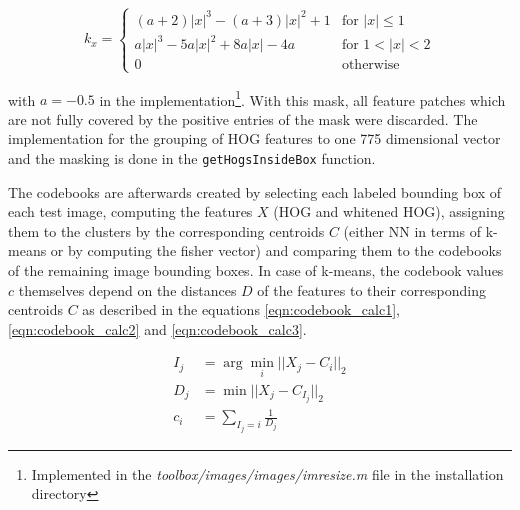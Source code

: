 \begin{equation}
k_x = \begin{cases}
(a+2)|x|^3-(a+3)|x|^2+1 & \text{for } |x| \leq 1 \\
a|x|^3-5a|x|^2+8a|x|-4a & \text{for } 1 < |x| < 2 \\
0                       & \text{otherwise}
\end{cases}
\label{eqn:bicubic_kernel}
\end{equation}

with $a=-0.5$ in the \MATLAB implementation\footnote{Implemented in the \textit{toolbox/images/images/imresize.m} file in the \MATLAB installation directory}. With this mask, all feature patches which are not fully covered by the positive entries of the mask were discarded. The implementation for the grouping of \ac{HOG} features to one 775 dimensional vector and the masking is done in the \verb|getHogsInsideBox| function.
\bigskip

The codebooks are afterwards created by selecting each labeled bounding box of each test image, computing the features $X$ (\ac{HOG} and whitened \ac{HOG}), assigning them to the clusters by the corresponding centroids $C$ (either \ac{NN} in terms of k-means or by computing the fisher vector) and comparing them to the codebooks of the remaining image bounding boxes. In case of k-means, the codebook values $c$ themselves depend on the distances $D$ of the features to their corresponding centroids $C$ as described in the equations \ref{eqn:codebook_calc1}, \ref{eqn:codebook_calc2} and \ref{eqn:codebook_calc3}.

%	

\begin{align}
	I_j &= \arg \min_i ||X_j - C_i||_2
	    \label{eqn:codebook_calc1} \\
	D_j &= \min ||X_j - C_{I_j}||_2
	    \label{eqn:codebook_calc2} \\
	c_i &= \sum_{I_j = i} \frac{1}{D_j}
	\label{eqn:codebook_calc3}
\end{align}

